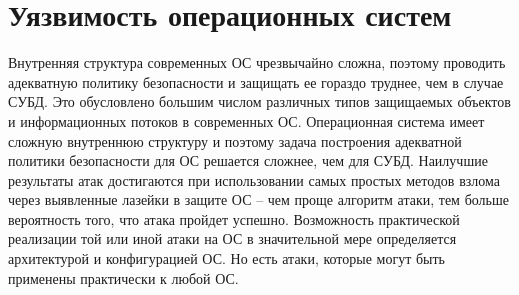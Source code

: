 \section{Уязвимость операционных систем} 

Внутренняя структура современных ОС чрезвычайно сложна, поэтому проводить
адекватную политику безопасности и защищать ее гораздо труднее, чем в случае
СУБД. Это обусловлено большим числом различных типов защищаемых объектов и
информационных потоков в современных ОС. Операционная система имеет сложную
внутреннюю структуру и поэтому задача построения адекватной политики
безопасности для ОС решается сложнее, чем для СУБД.
Наилучшие результаты атак достигаются при использовании самых простых методов
взлома через выявленные лазейки в защите ОС -- чем проще алгоритм атаки, тем
больше вероятность того, что атака пройдет успешно. Возможность практической
реализации той или иной атаки на ОС в значительной мере определяется
архитектурой и конфигурацией ОС. Но есть атаки, которые могут быть применены
практически к любой ОС.~\cite{zapechnikov}

